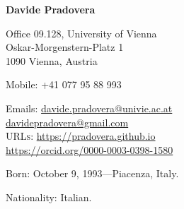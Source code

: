 \documentclass[11pt]{article} %
\begin{document}

\begin{minipage}[c]{.75\textwidth}
{\huge\bfseries Davide Pradovera} %
\bigskip\bigskip\medskip %

Office 09.128, University of Vienna \\
Oskar-Morgenstern-Platz 1 \\
1090 Vienna, Austria
\medskip %

Mobile: +41 077 95 88 993 %
\medskip %

Emails: \href{mailto:davide.pradovera@univie.ac.at}{davide.pradovera@univie.ac.at}\\ %
\phantom{Emails: }\href{mailto:davidepradovera@gmail.com}{davidepradovera@gmail.com}\\ %
\textsc{URLs}: \href{https://pradovera.github.io}{https://pradovera.github.io}\\ %
\href{https://orcid.org/0000-0003-0398-1580}{https://orcid.org/0000-0003-0398-1580}\\ %
\end{minipage}\hfill%
\begin{minipage}[c]{.225\textwidth}
\end{minipage}\hfill%

\smallskip %


Born: October 9, 1993---Piacenza, Italy. %

Nationality: Italian. %
\end{document}

